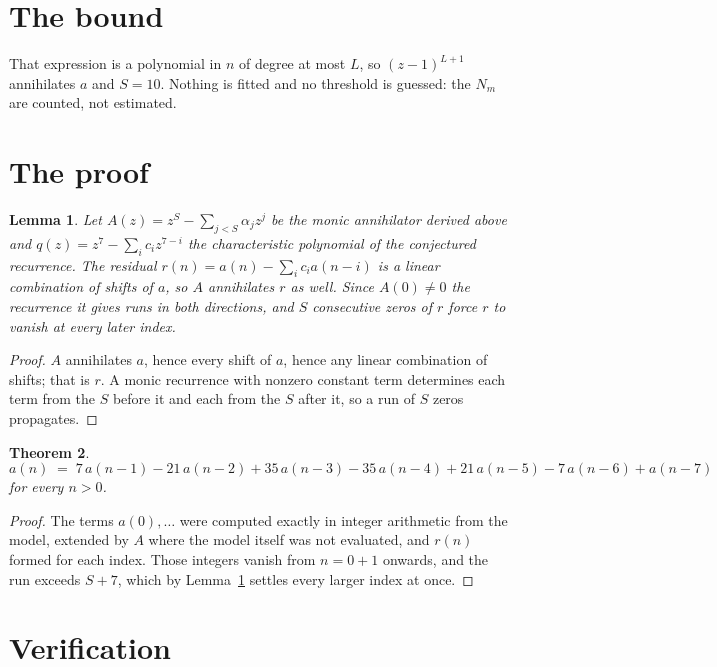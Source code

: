 \documentclass[11pt,a4paper]{article}
\theoremstyle{plain}
\newtheorem{theorem}{Theorem}
\newtheorem{lemma}[theorem]{Lemma}
\theoremstyle{definition}
\begin{document}
\section{The bound}

That expression is a polynomial in $n$ of degree at most $L$, so $(z-1)^{L+1}$ annihilates
$a$ and $S=10$. Nothing is fitted and no threshold is guessed: the $N_m$ are counted, not
estimated.

\section{The proof}

\begin{lemma}\label{lem:crit}
Let $A(z)=z^S-\sum_{j<S}\alpha_jz^{j}$ be the monic annihilator derived above and
$q(z)=z^{7}-\sum_ic_iz^{7-i}$ the characteristic polynomial of the conjectured
recurrence. The residual $r(n)=a(n)-\sum_ic_ia(n-i)$ is a linear combination of shifts of $a$,
so $A$ annihilates $r$ as well. Since $A(0)\ne0$ the recurrence it gives runs in both
directions, and $S$ consecutive zeros of $r$ force $r$ to vanish at every later index.
\end{lemma}

\begin{proof}
$A$ annihilates $a$, hence every shift of $a$, hence any linear combination of shifts; that is
$r$. A monic recurrence with nonzero constant term determines each term from the $S$ before it
and each from the $S$ after it, so a run of $S$ zeros propagates.
\end{proof}

\begin{theorem}
\[
a(n)\;=\;7\,a(n-1) - 21\,a(n-2) + 35\,a(n-3) - 35\,a(n-4) + 21\,a(n-5) - 7\,a(n-6) + a(n-7)
\]
for every $n>0$.
\end{theorem}

\begin{proof}
The terms $a(0),\dots$ were computed exactly in integer arithmetic from the model, extended by
$A$ where the model itself was not evaluated, and $r(n)$ formed for each index. Those integers
vanish from $n=0+1$ onwards, and the run exceeds $S+7$, which by
Lemma~\ref{lem:crit} settles every larger index at once.
\end{proof}

\section{Verification}
\end{document}
